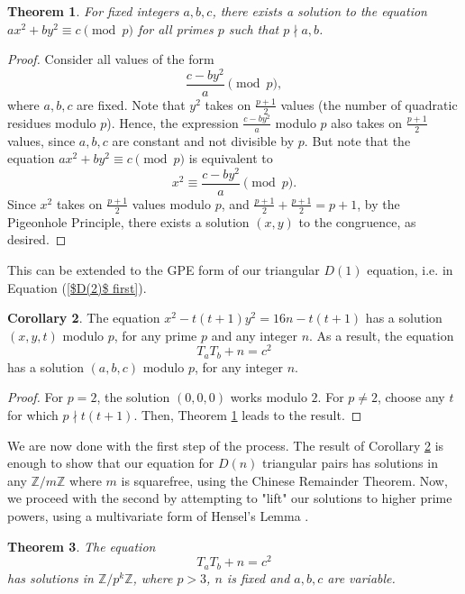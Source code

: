 \documentclass[12pt]{amsart}
\theoremstyle{theorem}
\newtheorem{theorem}{Theorem}
\theoremstyle{definition}
\newtheorem{corollary}[theorem]{Corollary}
\theoremstyle{plain}
\begin{document}
\begin{theorem}\label{sum of squares}
    For fixed integers $a,b,c$, there exists a solution to the equation $ax^2 + by^2 \equiv c \pmod{p}$ for all primes $p$ such that $p \nmid a,b$. 
\end{theorem}
\begin{proof}
    Consider all values of the form $$\frac{c-by^2}{a} \pmod{p},$$ where $a,b,c$ are fixed. Note that $y^2$ takes on $\frac{p+1}{2}$ values (the number of quadratic residues modulo $p$). Hence, the expression $\frac{c-by^2}{a}$ modulo $p$ also takes on $\frac{p+1}{2}$ values, since $a,b,c$ are constant and not divisible by $p$. But note that the equation $ax^2 + by^2 \equiv c \pmod{p}$ is equivalent to $$x^2 \equiv \frac{c-by^2}{a} \pmod{p}.$$ Since $x^2$ takes on $\frac{p+1}{2}$ values modulo $p$, and $\frac{p+1}{2} + \frac{p+1}{2} = p+1$, by the Pigeonhole Principle, there exists a solution $(x,y)$ to the congruence, as desired.
\end{proof}

This can be extended to the GPE form of our triangular $D(1)$ equation, i.e. in Equation (\ref{$D(2)$ first}).

\begin{corollary}\label{squarefree}
    The equation $x^2 - t(t+1)y^2 = 16n - t(t+1)$ has a solution $(x,y,t)$ modulo $p$, for any prime $p$ and any integer $n$. As a result, the equation $$T_a T_b + n = c^2$$ has a solution $(a,b,c)$ modulo $p$, for any integer $n$.
\end{corollary}
\begin{proof}
    For $p = 2$, the solution $(0,0,0)$ works modulo $2$. For $p \neq 2$, choose any $t$ for which $p \nmid t(t+1)$. Then, Theorem \ref{sum of squares} leads to the result. 
\end{proof}
We are now done with the first step of the process. The result of Corollary \ref{squarefree} is enough to show that our equation for $D(n)$ triangular pairs has solutions in any $\mathbb{Z} / m \mathbb{Z}$ where $m$ is squarefree, using the Chinese Remainder Theorem. Now, we proceed with the second by attempting to "lift" our solutions to higher prime powers, using a multivariate form of Hensel's Lemma \cite{b8}.

\begin{theorem}\label{weak version}
    The equation $$T_a T_b + n = c^2$$ has solutions in $\mathbb{Z}/p^k\mathbb{Z}$, where $p > 3$, $n$ is fixed and $a,b,c$ are variable.
\end{theorem}
\end{document}
